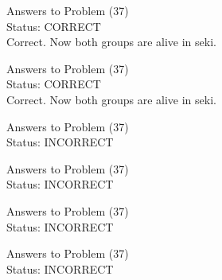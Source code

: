 \documentclass[11pt]{article}
\begin{document}
\begin{minipage}[t]{0.5\textwidth}
  {\centering
  
  Answers to Problem (37)\\
  Status: CORRECT\\
  Correct. Now both groups are alive in seki.\\
  }
\end{minipage}
\begin{minipage}[t]{0.5\textwidth}
  {\centering
  
  Answers to Problem (37)\\
  Status: CORRECT\\
  Correct. Now both groups are alive in seki.\\
  }
\end{minipage}
\begin{minipage}[t]{0.5\textwidth}
  {\centering
  
  Answers to Problem (37)\\
  Status: INCORRECT\\
  
  }
\end{minipage}
\begin{minipage}[t]{0.5\textwidth}
  {\centering
  
  Answers to Problem (37)\\
  Status: INCORRECT\\
  
  }
\end{minipage}
\begin{minipage}[t]{0.5\textwidth}
  {\centering
  
  Answers to Problem (37)\\
  Status: INCORRECT\\
  
  }
\end{minipage}
\begin{minipage}[t]{0.5\textwidth}
  {\centering
  
  Answers to Problem (37)\\
  Status: INCORRECT\\
  
  }
\end{minipage}
\end{document}
